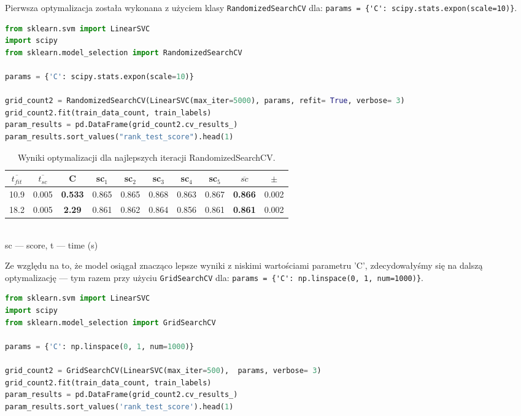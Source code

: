 \noindent Pierwsza optymalizacja została wykonana z użyciem klasy \verb|RandomizedSearchCV| dla: \verb|params = {'C': scipy.stats.expon(scale=10)}|.


\begin{lstlisting}[language=Python,frame=single, breaklines=true, caption=Optymalizacja hiperparametrów SVM (RandomizedSearchCV).,label=code:svm]
from sklearn.svm import LinearSVC
import scipy
from sklearn.model_selection import RandomizedSearchCV

params = {'C': scipy.stats.expon(scale=10)}

grid_count2 = RandomizedSearchCV(LinearSVC(max_iter=5000), params, refit= True, verbose= 3)
grid_count2.fit(train_data_count, train_labels)
param_results = pd.DataFrame(grid_count2.cv_results_)
param_results.sort_values("rank_test_score").head(1)
\end{lstlisting}

\bigskip
\begin{table} [H]
	\caption{Wyniki optymalizacji dla najlepszych iteracji RandomizedSearchCV.}
	\begin{center}
		\begin{tabular}{c  c || c || c  c  c  c  c  || c  || c }
			\hline
			$\overline{t_{fit}}$&$\overline{t_{sc}}$ &\textbf{C} &	sc$_1$&	sc$_2$ &sc$_3$ &	sc$_4$ &	sc$_5$	& \textbf{$\overline{sc}$ }&	$\pm$	\\
			\hline
			10.9&	0.005  & \textbf{0.533} & 0.865 &	0.865 &	0.868 &	0.863 &	0.867 &	\textbf{0.866} &	0.002 \\
			18.2&	0.005&	\textbf{2.29}&	0.861 &	0.862 &	0.864 &	0.856&	0.861&	\textbf{0.861}&	0.002 \\
			\hline
		\end{tabular} \\
		{\scriptsize sc --- score, t --- time (s)}
	\end{center}
\end{table}

\noindent Ze względu na to, że model osiągał znacząco lepsze wyniki z niskimi wartościami parametru 'C', zdecydowałyśmy się na dalszą optymalizację --- tym razem przy użyciu \verb|GridSearchCV| dla: \verb|params = {'C': np.linspace(0, 1, num=1000)}|.

\begin{lstlisting}[language=Python,frame=single, breaklines=true, caption=Optymalizacja hiperparametrów SVM (GridSearchCV).,label=code:svm1]
from sklearn.svm import LinearSVC
import scipy
from sklearn.model_selection import GridSearchCV

params = {'C': np.linspace(0, 1, num=1000)}

grid_count2 = GridSearchCV(LinearSVC(max_iter=500),  params, verbose= 3)
grid_count2.fit(train_data_count, train_labels)
param_results = pd.DataFrame(grid_count2.cv_results_)
param_results.sort_values('rank_test_score').head(1)
\end{lstlisting}


